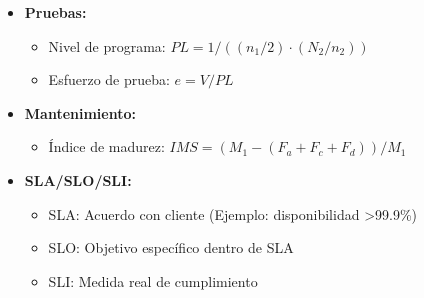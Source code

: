 \begin{itemize}
        \item \textbf{Pruebas:}
        \begin{itemize}
            \item Nivel de programa: $PL = 1 / ((n_1/2) \cdot (N_2/n_2))$
            \item Esfuerzo de prueba: $e = V / PL$
        \end{itemize}

        \item \textbf{Mantenimiento:}
        \begin{itemize}
            \item Índice de madurez: $IMS = (M_1 - (F_a + F_c + F_d)) / M_1$
        \end{itemize}

        \item \textbf{SLA/SLO/SLI:}
        \begin{itemize}
            \item SLA: Acuerdo con cliente (Ejemplo: disponibilidad >99.9\%)
            \item SLO: Objetivo específico dentro de SLA
            \item SLI: Medida real de cumplimiento
        \end{itemize}
    \end{itemize}

